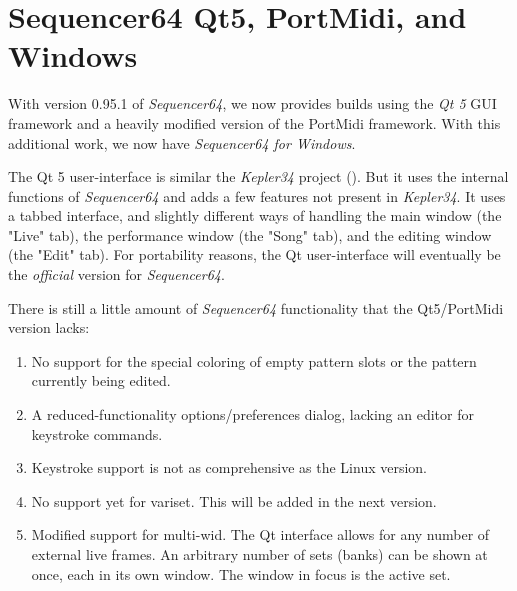 %
%
%

\section{Sequencer64 Qt5, PortMidi, and Windows}
\label{sec:qt_portmidi}

   With version 0.95.1 of \textsl{Sequencer64}, we now provides builds using
   the \textsl{Qt 5} GUI framework and a heavily modified version of the
   PortMidi framework.
   With this additional work, we now have
   \textsl{Sequencer64 for Windows}.

   The Qt 5 user-interface is similar
   the \textsl{Kepler34} project (\cite{kepler34}).
   But it uses the internal functions of \textsl{Sequencer64} and adds a few
   features not present in \textsl{Kepler34}.
   It uses a tabbed interface, and slightly different ways of handling the main
   window (the "Live" tab), the performance window (the "Song" tab), and the
   editing window (the "Edit" tab).
   For portability reasons, the Qt user-interface will eventually be the
   \textsl{official} version for \textsl{Sequencer64}.

   There is still a little amount of \textsl{Sequencer64} functionality that
   the Qt5/PortMidi version lacks:

   \begin{enumerate}
      \item No support for the special coloring of empty pattern slots
         or the pattern currently being edited.
      \item A reduced-functionality options/preferences dialog, lacking an
         editor for keystroke commands.
      \item Keystroke support is not as comprehensive as the Linux version.
      \item No support yet for variset.  This will be added in the next
         version.
      \item Modified support for multi-wid.  The Qt interface allows
         for any number of external live frames.
         An arbitrary number of sets (banks) can be shown at once,
         each in its own window.  The window in focus is the active set.
   \end{enumerate}

